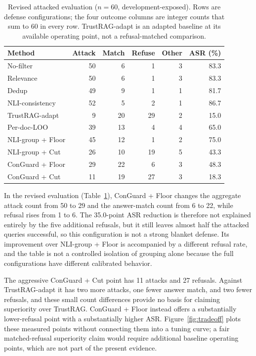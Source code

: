 \documentclass[sigconf]{aamas}
\begin{document}
\begin{table}[t]
\caption{Revised attacked evaluation ($n=60$, development-exposed). Rows are defense configurations; the four outcome columns are integer counts that sum to 60 in every row. TrustRAG-adapt is an adapted baseline at its available operating point, not a refusal-matched comparison.}
\label{tab:main}
\centering
\setlength{\tabcolsep}{4pt}
\begin{tabular}{lrrrrr}
\toprule
Method & Attack & Match & Refuse & Other & ASR (\%)\\
\midrule
No-filter & 50 & 6 & 1 & 3 & 83.3\\
Relevance & 50 & 6 & 1 & 3 & 83.3\\
Dedup & 49 & 9 & 1 & 1 & 81.7\\
NLI-consistency & 52 & 5 & 2 & 1 & 86.7\\
TrustRAG-adapt & 9 & 20 & 29 & 2 & 15.0\\
Per-doc-LOO & 39 & 13 & 4 & 4 & 65.0\\
NLI-group + Floor & 45 & 12 & 1 & 2 & 75.0\\
NLI-group + Cut & 26 & 10 & 19 & 5 & 43.3\\
ConGuard + Floor & 29 & 22 & 6 & 3 & 48.3\\
ConGuard + Cut & 11 & 19 & 27 & 3 & 18.3\\
\bottomrule
\end{tabular}
\end{table}

In the revised evaluation (Table~\ref{tab:main}), ConGuard + Floor changes the aggregate attack count from 50 to 29 and the answer-match count from 6 to 22, while refusal rises from 1 to 6. The 35.0-point ASR reduction is therefore not explained entirely by the five additional refusals, but it still leaves almost half the attacked queries successful, so this configuration is not a strong blanket defense. Its improvement over NLI-group + Floor is accompanied by a different refusal rate, and the table is not a controlled isolation of grouping alone because the full configurations have different calibrated behavior.

The aggressive ConGuard + Cut point has 11 attacks and 27 refusals. Against TrustRAG-adapt it has two more attacks, one fewer answer match, and two fewer refusals, and these small count differences provide no basis for claiming superiority over TrustRAG. ConGuard + Floor instead offers a substantially lower-refusal point with a substantially higher ASR. Figure~\ref{fig:tradeoff} plots these measured points without connecting them into a tuning curve; a fair matched-refusal superiority claim would require additional baseline operating points, which are not part of the present evidence.
\end{document}
